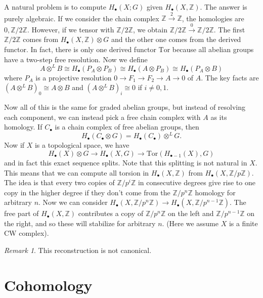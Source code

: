 \documentclass[leqno, openany]{memoir}
\theoremstyle{definition}
\theoremstyle{remark}
\newtheorem{rmk}[thm]{Remark}
\theoremstyle{plain}
\theoremstyle{definition}
\theoremstyle{remark}
\newcommand{\Z}{\mathbb{Z}}
\newcommand{\mr}[1]{\mathrm{#1}}
\begin{document}
A natural problem is to compute $H_{\bullet}(X;G)$ given $H_{\bullet}(X,\Z)$. The answer is purely algebraic. If we consider the chain complex $\Z \xrightarrow{2} \Z$, the homologies are $0, \Z/2\Z$. However, if we tensor with $\Z/2\Z$, we obtain $\Z/2\Z \xrightarrow{0} \Z/2\Z$. The first $\Z/2\Z$ comes from $H_{\bullet}(X, \Z) \otimes G$ and the other one comes from the derived functor. In fact, there is only one derived functor $\mr{Tor}$ because all abelian groups have a two-step free resolution. Now we define
\[ A \otimes^L B \cong H_{\bullet}(P_A \otimes P_B) \cong H_{\bullet}(A \otimes P_B) \cong H_{\bullet}(P_A \otimes B) \]
where $P_A$ is a projective resolution $0 \to F_1 \to F_2 \to A \to 0$ of $A$. The key facts are $(A \otimes^L B)_0 \cong A \otimes B$ and $(A \otimes^L B)_i \cong 0$ if $i \neq 0,1$.

Now all of this is the same for graded abelian groups, but instead of resolving each component, we can instead pick a free chain complex with $A$ as its homology. If $C_{\bullet}$ is a chain complex of free abelian groups, then 
\[ H_{\bullet}(C_{\bullet} \otimes G) = H_{\bullet}(C_{\bullet}) \otimes^L G. \] 
Now if $X$ is a topological space, we have
\[ H_{\bullet}(X) \otimes G \to H_{\bullet}(X, G) \to \mr{Tor}(H_{\bullet - 1}(X), G) \]
and in fact this exact sequence splits. Note that this splitting is not natural in $X$. This means that we can compute all torsion in $H_{\bullet}(X, \Z)$ from $H_{\bullet}(X, \Z/p\Z)$. The idea is that every two copies of $\Z/p^i\Z$ in consecutive degrees give rise to one copy in the higher degree if they don't come from the $\Z/p^n\Z$ homology for arbitrary $n$. Now we can consider $H_{\bullet}(X, \Z/p^n\Z) \to H_{\bullet}(X, \Z/p^{n-1}\Z)$. The free part of $H_{\bullet}(X, \Z)$ contributes a copy of $\Z/p^n\Z$ on the left and $\Z/p^{n-1}\Z$ on the right, and so these will stabilize for arbitrary $n$. (Here we assume $X$ is a finite CW complex). 

\begin{rmk}
    This reconstruction is not canonical.
\end{rmk}

\chapter{Cohomology}%
\label{cha:cohomology}
\end{document}
